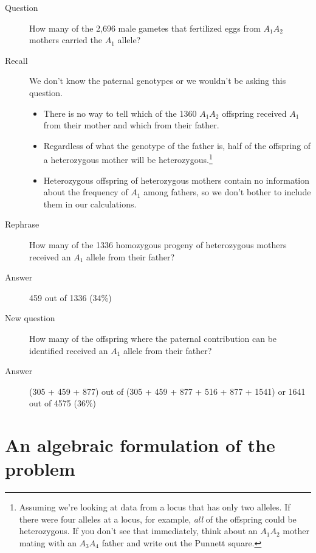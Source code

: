 \documentclass[12pt]{article}
\begin{document}
\begin{description}

\item[Question] How many of the 2,696 male gametes that fertilized
eggs from $A_1A_2$ mothers carried the $A_1$ allele?

\item[Recall] We don't know the paternal genotypes or we wouldn't be
asking this question.

\begin{itemize}

\item There is no way to tell which of the 1360 $A_1A_2$ offspring
  received $A_1$ from their mother and which from their father.

\item Regardless of what the genotype of the father is, half of the
  offspring of a heterozygous mother will be
  heterozygous.\footnote{Assuming we're looking at data from a locus
    that has only two alleles. If there were four alleles at a locus,
    for example, {\it all\/} of the offspring could be
    heterozygous. If you don't see that immediately, think about an
    $A_1A_2$ mother mating with an $A_3A_4$ father and write out the
    Punnett square.}

\item Heterozygous offspring of heterozygous mothers contain no
information about the frequency of $A_1$ among fathers, so we don't
bother to include them in our calculations.

\end{itemize}

\item[Rephrase] How many of the 1336 homozygous progeny of
heterozygous mothers received an $A_1$ allele from their father?

\item[Answer] 459 out of 1336 (34\%)

\item[New question] How many of the offspring where the paternal
contribution can be identified received an $A_1$ allele from their
father?

\item[Answer] (305 + 459 + 877) out of (305 + 459 + 877 + 516 + 877 +
1541) or 1641 out of 4575 (36\%)

\end{description}

\section*{An algebraic formulation of the problem}
\end{document}
